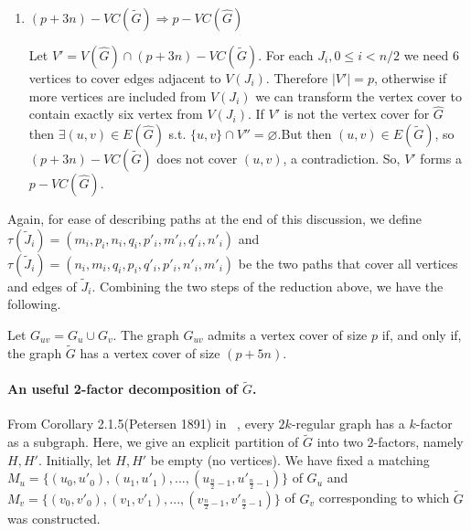 \documentclass[svgnames]{llncs}
\begin{document}
{\begin{enumerate}
Since $\hat{G} \subset \tilde{G}$, only extra edges in $\tilde{G}$ are those adjacent to vertices of gadgets $\tilde{J}_i$ for $0 \leq i < n/2$.
From $V(J_i)$ if we include vertices $\{m_i,m'_i,n_i,n'_ip_i,p'_i\}$, then they will cover all edges that are adjacent to at least one vertex in $V(J_i)$, for all $0 \leq i < n/2$.
This implies that $p+3n$ vertices are sufficient to cover $E(\tilde{G})$.

\item $(p+3n)-VC(\tilde{G}) \Longrightarrow p-VC(\hat{G})$

Let $V'= V(\hat{G})\cap (p+3n)-VC(\tilde{G})$.
For each $J_i, 0 \leq i <n/2$ we need 6 vertices to cover edges adjacent to $V(J_i)$.  Therefore 
$\lvert V'\rvert =p$, otherwise if more vertices are included from $V(J_i)$ we can transform the vertex cover to contain exactly six vertex from $V(J_i)$. 
If $V'$ is not the vertex cover for $\hat{G}$ then $\exists (u,v) \in E(\hat{G})$ s.t. $\{u,v\}\cap V''=\varnothing$.But 
then $(u,v) \in E(\tilde{G})$, so $(p+3n)-VC(\tilde{G})$ does not cover $(u,v)$, a contradiction. So, $V'$ forms a $p-VC(\hat{G})$.
\end{enumerate}
\fi


Again, for ease of describing paths at the end of this discussion, we define $\tau(\tilde{J}_i)=(m_i,p_i,n_i,q_i,p'_i,m'_i,q'_i,n'_i)$
and $\tau(\tilde{J}_i)=(n_i,m_i,q_i,p_i,q'_i,p'_i,n'_i,m'_i)$ be the two paths that cover all vertices and edges of $\tilde{J}_i$. Combining the two steps of the reduction above, we have the following.


\begin{corollary}
Let $G_{uv}=G_u \cup G_v$. The graph $G_{uv}$ admits a vertex cover of size $p$ if, and only if, the graph $\tilde{G}$ has a vertex cover of size $(p+5n)$. 
\label{WSDNPH}
\end{corollary}

\paragraph{An useful 2-factor decomposition of $\tilde{G}$.}
\label{2-factor} From Corollary 2.1.5(Petersen 1891) in ~\cite{DBLP:books/daglib/0030488}, every $2k$-regular graph has a $k$-factor as a subgraph. Here, we give an explicit partition of $\tilde{G}$ into two $2$-factors, namely $H,H'$.  Initially, let $H,H'$ be empty (no vertices). We have fixed a matching
$M_u=\{(u_0,u'_0),(u_1,u'_1),...,(u_{\frac{n}{2}-1},u'_{\frac{n}{2}-1})\}$ of $G_u$ and $M_v=\{(v_0,v'_0),(v_1,v'_1),...,(v_{\frac{n}{2}-1},v'_{\frac{n}{2}-1})\}$ of $G_v$ corresponding to which $\tilde{G}$ was constructed.

}
\end{document}
